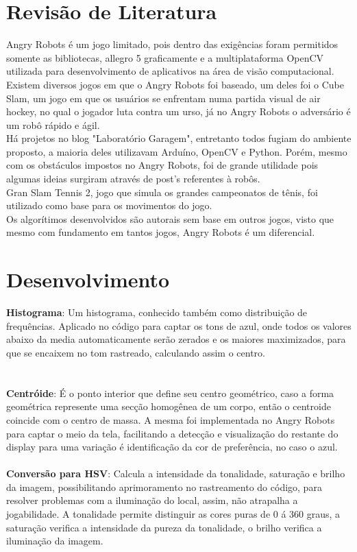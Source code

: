 \documentclass[12pt,openright,oneside,a4paper,brazil]{abntex2}
\begin{document}
\section*{Revisão de Literatura}

Angry Robots é um jogo limitado, pois dentro das exigências foram permitidos somente as bibliotecas, allegro 5 graficamente e a multiplataforma OpenCV utilizada para desenvolvimento de aplicativos na área de visão computacional. \\
Existem diversos jogos em que o Angry Robots foi baseado, um deles foi o Cube Slam, um jogo em que os usuários se enfrentam numa partida visual de air hockey, no qual o jogador luta contra um urso, já no Angry Robots o adversário é um robô rápido e ágil. \\
Há projetos no blog "Laboratório Garagem", entretanto todos fugiam do ambiente proposto, a maioria deles utilizavam Arduíno, OpenCV e Python. Porém, mesmo com os obstáculos impostos no Angry Robots, foi de grande utilidade pois algumas ideias surgiram através de post's referentes à robôs. \\
Gran Slam Tennis 2, jogo que simula os grandes campeonatos de tênis, foi utilizado como base para os movimentos do jogo. \\ 
Os algorítimos desenvolvidos são autorais sem base em outros jogos, visto que mesmo com fundamento em tantos jogos, Angry Robots é um diferencial.

\section*{Desenvolvimento}

\textbf{Histograma}:
Um histograma, conhecido também como distribuição de frequências. Aplicado no código para captar os tons de azul, onde todos os valores abaixo da media automaticamente serão zerados e os maiores maximizados, para que se encaixem no tom rastreado, calculando assim o centro.
\\ \\ \\ \textbf{Centróide}:
É o ponto interior que define seu centro geométrico, caso a forma geométrica represente uma secção homogênea de um corpo, então o centroide coincide com o centro de massa. A mesma foi implementada no Angry Robots para captar o meio da tela, facilitando a detecção e visualização do restante do display para uma variação é identificação da cor de preferência, no caso o azul. 
\\ \\ \textbf{Conversão para HSV}: 
Calcula a intensidade da tonalidade, saturação e brilho da imagem, possibilitando aprimoramento no rastreamento do código, para resolver problemas com a iluminação do local, assim, não atrapalha a jogabilidade. A tonalidade permite distinguir as cores puras de 0 á 360 graus, a saturação verifica a intensidade da pureza da tonalidade, o brilho verifica a iluminação da imagem. 
\end{document}
